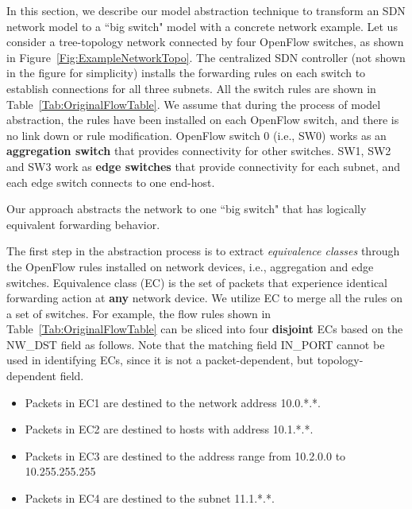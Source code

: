In this section, we describe our model abstraction technique to transform an SDN network model to a ``big switch" model with a concrete network example. Let us consider a tree-topology network connected by four OpenFlow switches, as shown in Figure~\ref{Fig:ExampleNetworkTopo}.
The centralized SDN controller (not shown in the figure for simplicity) installs the forwarding rules on each switch to establish connections for all three subnets.
All the switch rules are shown in Table~\ref{Tab:OriginalFlowTable}. We assume that during the process of model abstraction, the rules have been installed on each OpenFlow switch, and there is no link down or rule modification. OpenFlow switch 0 (i.e., SW0) works as an \textbf{aggregation switch} that provides connectivity for other switches. SW1, SW2 and SW3 work as \textbf{edge switches} that provide connectivity for each subnet, and each edge switch connects to one end-host.

Our approach abstracts the network to one ``big switch" that has logically equivalent forwarding behavior.

The first step in the abstraction process is to extract \textit{equivalence classes} through the OpenFlow rules installed on network devices, i.e., aggregation and edge switches.
Equivalence class (EC) is the set of packets that experience identical forwarding action at \textbf{any} network device.
We utilize EC to merge all the rules on a set of switches. For example, the flow rules shown in Table~\ref{Tab:OriginalFlowTable} can be sliced into
four \textbf{disjoint} ECs based on the NW\_DST field as follows. Note that the matching field IN\_PORT cannot be used in identifying ECs, since it is not a packet-dependent, but topology-dependent field.

\begin{itemize}
\item Packets in EC1 are destined to the network address 10.0.*.*.
\item Packets in EC2 are destined to hosts with address 10.1.*.*.
\item Packets in EC3 are destined to the address range from 10.2.0.0 to 10.255.255.255
\item Packets in EC4 are destined to the subnet 11.1.*.*.
\end{itemize}

